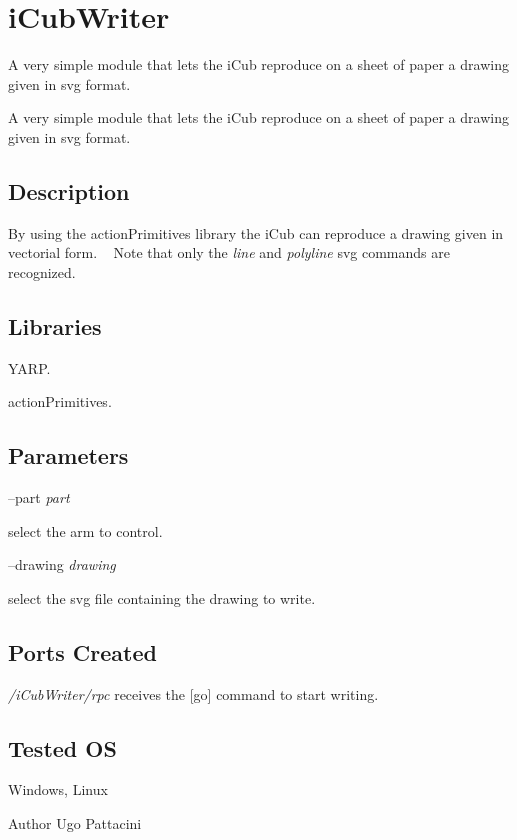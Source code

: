 \section{i\+Cub\+Writer}
\label{group__icub__iCubWriter}


A very simple module that lets the i\+Cub reproduce on a sheet of paper a drawing given in svg format.  


A very simple module that lets the i\+Cub reproduce on a sheet of paper a drawing given in svg format. 

\hypertarget{group__icub__iCubWriter_intro_sec}{}\subsection{Description}\label{group__icub__iCubWriter_intro_sec}
By using the action\+Primitives library the i\+Cub can reproduce a drawing given in vectorial form. ~\newline
 Note that only the {\itshape line} and {\itshape polyline} svg commands are recognized. ~\newline
\hypertarget{group__icub__iCubWriter_lib_sec}{}\subsection{Libraries}\label{group__icub__iCubWriter_lib_sec}

\begin{DoxyItemize}
\item Y\+A\+R\+P.
\item action\+Primitives.
\end{DoxyItemize}\hypertarget{group__icub__iCubWriter_parameters_sec}{}\subsection{Parameters}\label{group__icub__iCubWriter_parameters_sec}
--part {\itshape part} 
\begin{DoxyItemize}
\item select the arm to control.
\end{DoxyItemize}

--drawing {\itshape drawing} 
\begin{DoxyItemize}
\item select the svg file containing the drawing to write.
\end{DoxyItemize}\hypertarget{group__icub__iCubWriter_portsc_sec}{}\subsection{Ports Created}\label{group__icub__iCubWriter_portsc_sec}
{\itshape /i\+Cub\+Writer/rpc} receives the \mbox{[}go\mbox{]} command to start writing.\hypertarget{group__icub__iCubWriter_tested_os_sec}{}\subsection{Tested O\+S}\label{group__icub__iCubWriter_tested_os_sec}
Windows, Linux

\begin{DoxyAuthor}{Author}
Ugo Pattacini 
\end{DoxyAuthor}
